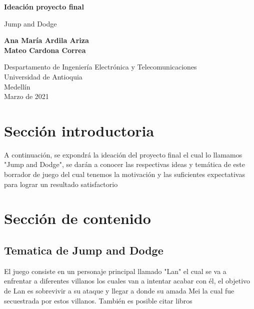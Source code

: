 \documentclass{article}
\begin{document}
\begin{titlepage}
    \begin{center}
        \vspace*{1cm}
            
        \Huge
        \textbf{Ideación proyecto final}
            
        \vspace{0.5cm}
        \LARGE
        Jump and Dodge
            
        \vspace{1.5cm}
            
        \textbf{Ana María Ardila Ariza\\ Mateo Cardona Correa}
            
        \vfill
            
        \vspace{0.8cm}
            
        \Large
        Despartamento de Ingeniería Electrónica y Telecomunicaciones\\
        Universidad de Antioquia\\
        Medellín\\
        Marzo de 2021
            
    \end{center}
\end{titlepage}

\tableofcontents
\newpage
\section{Sección introductoria}\label{intro}
A continuación, se expondrá la ideación del proyecto final el cual lo llamamos "Jump and Dodge", se darán a conocer las respectivas ideas y temática de este borrador de juego del cual tenemos la motivación y las suficientes expectativas para lograr un resultado satisfactorio

\section{Sección de contenido} \label{contenido}
\subsection{Tematica de Jump and Dodge}
El juego consiste en un personaje principal llamado "Lan" el cual se va a enfrentar a diferentes villanos los cuales van a intentar acabar con él, el objetivo de Lan es sobrevivir a su ataque y llegar a donde su amada Mei la cual fue secuestrada por estos villanos.
También es posible citar libros 
\end{document}

